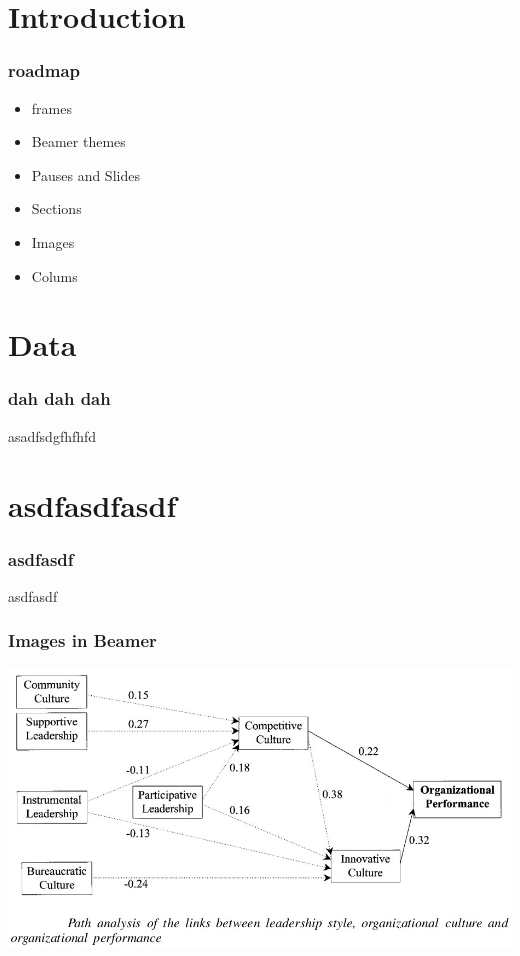





\maketitle

\section{Introduction
}
\begin{frame}
\frametitle{roadmap}

\begin{itemize}
\item frames
\item Beamer themes
\item Pauses and Slides
\item Sections
\item Images
\item Colums
\end{itemize}

\end{frame}

\section{Data}

\begin{frame}
\frametitle{dah dah dah}

asadfsdgfhfhfd

\end{frame}

\section{asdfasdfasdf}

\begin{frame}
\frametitle{asdfasdf}

asdfasdf

\end{frame}



\begin{frame}
\frametitle{Images in Beamer}

\includegraphics[scale=0.1]{./image/OB/CORGA_1.jpg}

\end{frame}

